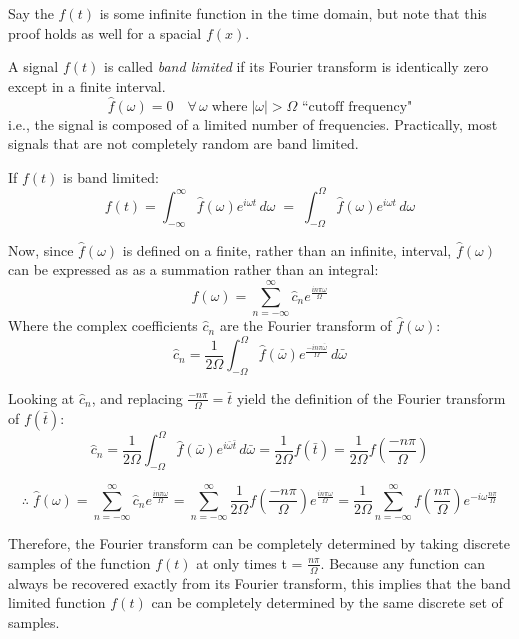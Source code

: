 \documentclass[12pt]{article}
\newcommand{\inftyint}{\int_{-\infty}^{\infty}}
\begin{document}
Say the \(f(t)\) is some infinite function in the time domain, but note that 
this proof holds as well for a spacial \(f(x)\).

A signal \(f(t)\) is called \emph{band limited} if its Fourier transform is 
identically zero except in a finite interval.
\[\hat{f}(\omega) = 0 \quad \forall \, \omega \; \text{where} \; |\omega| > 
\Omega \text{ ``cutoff frequency"}\]
i.e., the signal is composed of a limited number of frequencies. Practically, 
most signals that are not completely random are band limited.

If \(f(t)\) is band limited:
\begin{equation}
\label{eq:nft}
f(t) = \inftyint \hat{f}(\omega)e^{i\omega t} \,d\omega \; = \; 
\int_{-\Omega}^{\Omega} \hat{f}(\omega)e^{i\omega t} \,d\omega
\end{equation}

Now, since \( \hat{f}(\omega) \) is defined on a finite, rather than an 
infinite, interval, \( \hat{f}(\omega) \) can be expressed as as a summation 
rather than an integral:
\[\hat{f}(\omega) = \sum_{n = -\infty}^{\infty} \hat{c}_{n}e^{\frac{i n \pi 
\omega}{\Omega}} \]
Where the complex coefficients \( \hat{c}_n\) are the Fourier transform of \( 
\hat{f}(\omega) \):
\[\hat{ c}_n = \frac{1}{2\Omega} \int_{-\Omega}^{\Omega} 
\hat{f}(\bar{\omega})e^{\frac{-i n \pi \bar{ \omega}}{\Omega}}\,d\bar{\omega}\]

Looking at \(\hat{c}_n\), and replacing \( \frac{-n\pi}{\Omega} = \bar{t}\) 
yield the definition of the Fourier transform of \( f(\bar{t})\):
\[ \hat{c}_n = \frac{1}{2\Omega} \int_{-\Omega}^{\Omega} 
\hat{f}(\bar{\omega})e^{i\bar{\omega}\bar{t}}\,d\bar{\omega} = 
\frac{1}{2\Omega} f(\bar{t}) = \frac{1}{2\Omega} f(\frac{-n\pi}{\Omega})\]

\begin{equation}
\label{eq:nfhat}
\therefore \; \hat{f}(\omega) = \sum_{n = -\infty}^{\infty} 
\hat{c}_{n}e^{\frac{i n \pi \omega}{\Omega}} = \sum_{n = -\infty}^{\infty} 
\frac{1}{2\Omega} f(\frac{-n\pi}{\Omega})e^{\frac{i n \pi \omega}{\Omega}} = 
\frac{1}{2\Omega} \sum_{n = -\infty}^{\infty} f(\frac{n\pi}{\Omega})e^{-i 
\omega \frac{n \pi}{\Omega} } 
\end{equation}

Therefore, the Fourier transform can be completely determined by taking 
discrete samples of the function \( f(t) \) at only times t = \( 
\frac{n\pi}{\Omega}\). Because any function can always be recovered exactly 
from its Fourier transform, this implies that the band limited function \( f(t) 
\) can be completely determined by the same discrete set of samples.
\end{document}

